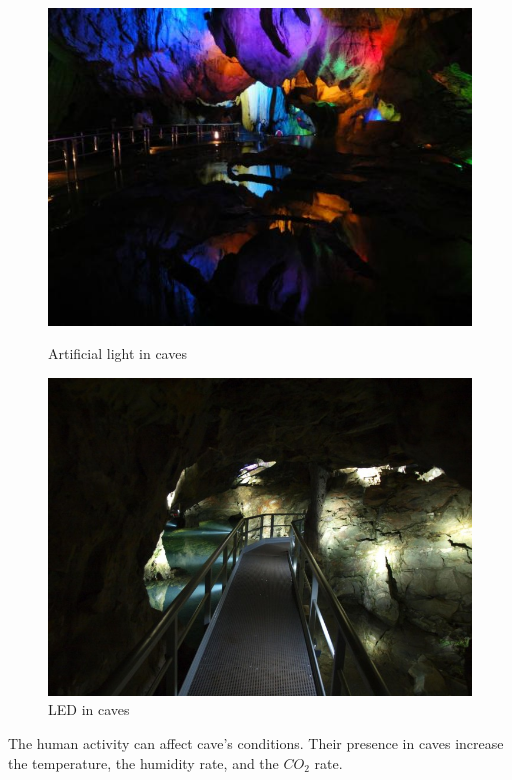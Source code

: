 \documentclass[draft, final]{report}
\begin{document}
\begin{figure}[!ht]
    \begin{minipage}[c]{.46\linewidth}
        \centering
        \includegraphics[scale=0.4]{LateX/Images/artificiallight1.jpg}
        \caption{Artificial light in caves\cite{artificiallight1}}
    \end{minipage}
    \hfill%
    \begin{minipage}[c]{.46\linewidth}
        \centering
        \includegraphics[scale=0.3]{LateX/Images/artificiallight2.jpg}
        \caption{LED in caves\cite{artificiallight2}}
    \end{minipage}
  \end{figure}
The human activity can affect cave's conditions. Their presence in caves increase the temperature, the humidity rate, and the $CO_{2}$ rate.
\end{document}
